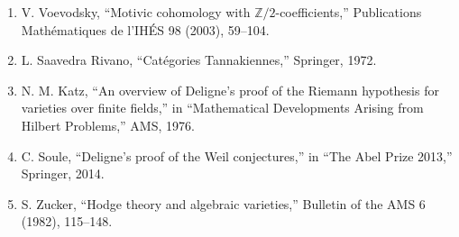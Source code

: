 \begin{enumerate}
\item V. Voevodsky, ``Motivic cohomology with $\mathbb{Z}/2$-coefficients,'' Publications Math\'ematiques de l'IH\'ES 98 (2003), 59--104.
\item L. Saavedra Rivano, ``Cat\'egories Tannakiennes,'' Springer, 1972.
\item N. M. Katz, ``An overview of Deligne's proof of the Riemann hypothesis for varieties over finite fields,'' in ``Mathematical Developments Arising from Hilbert Problems,'' AMS, 1976.
\item C. Soule, ``Deligne's proof of the Weil conjectures,'' in ``The Abel Prize 2013,'' Springer, 2014.
\item S. Zucker, ``Hodge theory and algebraic varieties,'' Bulletin of the AMS 6 (1982), 115--148.
\end{enumerate}
